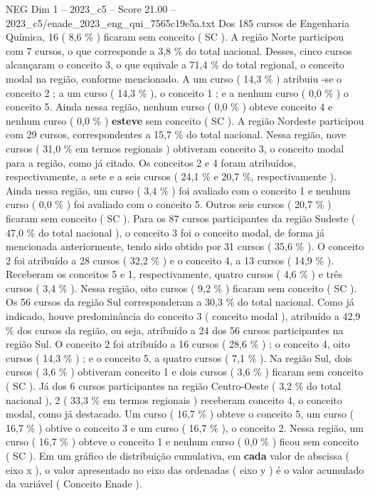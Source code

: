 \begin{textsample}{NEG Dim 1 – 2023\_c5 – Score 21.00 – 2023\_c5/enade\_2023\_eng\_qui\_7565c19e5a.txt}
Dos 185 cursos de Engenharia Química, 16 ( 8,6 \% ) ficaram sem conceito ( SC ).
A região Norte participou com 7 cursos, o que corresponde a 3,8 \% do total nacional.
Desses, cinco cursos alcançaram o conceito 3, o que equivale a 71,4 \% do total regional, o conceito modal na região, conforme mencionado.
A um curso ( 14,3 \% ) atribuiu -se o conceito 2 ; a um curso ( 14,3 \% ), o conceito 1 ; e a nenhum curso ( 0,0 \% ) o conceito 5.
Ainda nessa região, nenhum curso ( 0,0 \% ) obteve conceito 4 e nenhum curso ( 0,0 \% ) \textbf{esteve} sem conceito ( SC ).
A região Nordeste participou com 29 cursos, correspondentes a 15,7 \% do total nacional.
Nessa região, nove cursos ( 31,0 \% em termos regionais ) obtiveram conceito 3, o conceito modal para a região, como já citado.
Os conceitos 2 e 4 foram atribuídos, respectivamente, a sete e a seis cursos ( 24,1 \% e 20,7 \%, respectivamente ).
Ainda nessa região, um curso ( 3,4 \% ) foi avaliado com o conceito 1 e nenhum curso ( 0,0 \% ) foi avaliado com o conceito 5.
Outros seis cursos ( 20,7 \% ) ficaram sem conceito ( SC ).
Para os 87 cursos participantes da região Sudeste ( 47,0 \% do total nacional ), o conceito 3 foi o conceito modal, de forma já mencionada anteriormente, tendo sido obtido por 31 cursos ( 35,6 \% ).
O conceito 2 foi atribuído a 28 cursos ( 32,2 \% ) e o conceito 4, a 13 cursos ( 14,9 \% ).
Receberam os conceitos 5 e 1, respectivamente, quatro cursos ( 4,6 \% ) e três cursos ( 3,4 \% ).
Nessa região, oito cursos ( 9,2 \% ) ficaram sem conceito ( SC ).
Os 56 cursos da região Sul corresponderam a 30,3 \% do total nacional.
Como já indicado, houve predominância do conceito 3 ( conceito modal ), atribuído a 42,9 \% dos cursos da região, ou seja, atribuído a 24 dos 56 cursos participantes na região Sul.
O conceito 2 foi atribuído a 16 cursos ( 28,6 \% ) ; o conceito 4, oito cursos ( 14,3 \% ) ; e o conceito 5, a quatro cursos ( 7,1 \% ).
Na região Sul, dois cursos ( 3,6 \% ) obtiveram conceito 1 e dois cursos ( 3,6 \% ) ficaram sem conceito ( SC ).
Já dos 6 cursos participantes na região Centro-Oeste ( 3,2 \% do total nacional ), 2 ( 33,3 \% em termos regionais ) receberam conceito 4, o conceito modal, como já destacado.
Um curso ( 16,7 \% ) obteve o conceito 5, um curso ( 16,7 \% ) obtive o conceito 3 e um curso ( 16,7 \% ), o conceito 2.
Nessa região, um curso ( 16,7 \% ) obteve o conceito 1 e nenhum curso ( 0,0 \% ) ficou sem conceito ( SC ).
Em um gráfico de distribuição cumulativa, em \textbf{cada} valor de abscissa ( eixo x ), o valor apresentado no eixo das ordenadas ( eixo y ) é o valor acumulado da variável ( Conceito Enade ).

\end{textsample}
